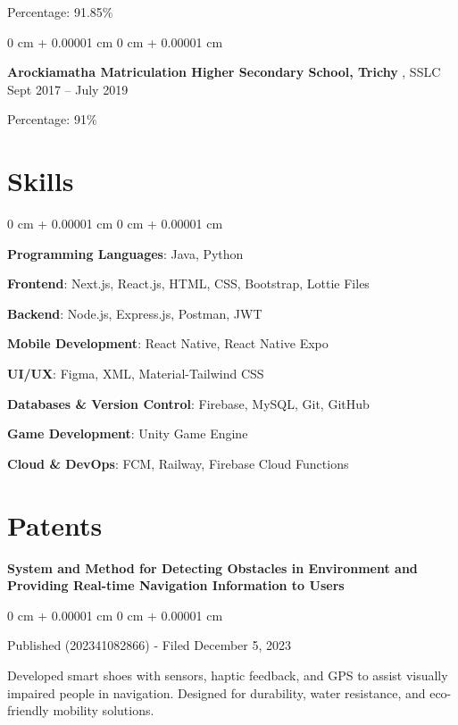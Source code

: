\documentclass[10pt, letterpaper]{article}
\newenvironment{onecolentry}{
    \begin{adjustwidth}{
        0 cm + 0.00001 cm
    }{
        0 cm + 0.00001 cm
    }
}{
    \end{adjustwidth}
} %
\newenvironment{twocolentry}[2][]{
    \onecolentry
    \def\secondColumn{#2}
    \setcolumnwidth{\fill, 4.5 cm}
    \begin{paracol}{2}
}{
    \switchcolumn \raggedleft \secondColumn
    \end{paracol}
    \endonecolentry
} %
\begin{document}
        \vspace{0.10 cm}
       Percentage: 91.85\%
       \vspace{0.10 cm}
\begin{twocolentry}{
            Sept 2017 – July 2019
        }
            \textbf{Arockiamatha Matriculation Higher Secondary School, Trichy  }, SSLC\end{twocolentry}

        \vspace{0.10 cm}
       Percentage: 91\%

        
    \section{Skills}
    \begin{onecolentry}
        \item \textbf{Programming Languages}: Java, Python
        \item \textbf{Frontend}: Next.js, React.js, HTML, CSS, Bootstrap, Lottie Files
        \item \textbf{Backend}: Node.js, Express.js, Postman, JWT
        \item \textbf{Mobile Development}: React Native, React Native Expo
        \item \textbf{UI/UX}: Figma, XML, Material-Tailwind CSS
        \item \textbf{Databases \& Version Control}: Firebase, MySQL, Git, GitHub
        \item \textbf{Game Development}: Unity Game Engine
        \item \textbf{Cloud \& DevOps}: FCM, Railway, Firebase Cloud Functions
\end{onecolentry}

  \section{Patents}
       
        \begin{samepage}
     \textbf{System and Method for Detecting Obstacles in Environment and Providing Real-time Navigation Information to Users}
      \vspace{0.05 cm}
      
      \begin{onecolentry}
               Published (202341082866) - Filed December 5, 2023 
               
               \vspace{0.05 cm}
               
               Developed smart shoes with sensors, haptic feedback, and GPS to assist visually impaired people in navigation. Designed for durability, water resistance, and eco-friendly mobility solutions.  
        \end{onecolentry}
        \end{samepage}
\end{document}
